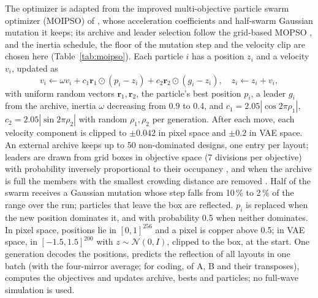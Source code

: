 \documentclass[journal]{IEEEtran}
\begin{document}
The optimizer is adapted from the improved multi-objective particle swarm optimizer (MOIPSO) of \cite{moipso}, whose acceleration coefficients and half-swarm Gaussian mutation it keeps; its archive and leader selection follow the grid-based MOPSO \cite{mopso}, and the inertia schedule, the floor of the mutation step and the velocity clip are chosen here (Table~\ref{tab:moipso}). Each particle $i$ has a position $z_i$ and a velocity $v_i$, updated as
\begin{equation}
v_i\leftarrow\omega v_i+c_1\mathbf r_1\odot(p_i-z_i)+c_2\mathbf r_2\odot(g_i-z_i),\quad z_i\leftarrow z_i+v_i ,
\end{equation}
with uniform random vectors $\mathbf r_1,\mathbf r_2$, the particle's best position $p_i$, a leader $g_i$ from the archive, inertia $\omega$ decreasing from 0.9 to 0.4, and $c_1=2.05|\cos2\pi\rho_1|$, $c_2=2.05|\sin2\pi\rho_2|$ with random $\rho_1,\rho_2$ per generation. After each move, each velocity component is clipped to $\pm0.042$ in pixel space and $\pm0.2$ in VAE space. An external archive keeps up to 50 non-dominated designs, one entry per layout; leaders are drawn from grid boxes in objective space (7 divisions per objective) with probability inversely proportional to their occupancy \cite{mopso}, and when the archive is full the members with the smallest crowding distance are removed \cite{nsga2}. Half of the swarm receives a Gaussian mutation whose step falls from 10\,\% to 2\,\% of the range over the run; particles that leave the box are reflected. $p_i$ is replaced when the new position dominates it, and with probability 0.5 when neither dominates. In pixel space, positions lie in $[0,1]^{256}$ and a pixel is copper above 0.5; in VAE space, in $[-1.5,1.5]^{200}$ with $z\sim\mathcal N(0,I)$, clipped to the box, at the start. One generation decodes the positions, predicts the reflection of all layouts in one batch (with the four-mirror average; for coding, of A, B and their transposes), computes the objectives and updates archive, bests and particles; no full-wave simulation is used.
\end{document}
